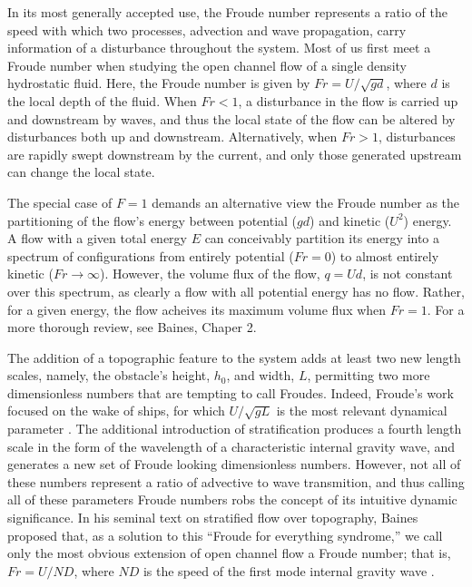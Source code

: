 \documentclass[12pt]{article}
\begin{document}
	In its most generally accepted use, the Froude number represents a ratio of the speed with which two processes,  advection and wave propagation, carry information of a disturbance throughout the system. Most of us first meet a Froude number when studying the open channel flow of a single density hydrostatic fluid. Here, the Froude number is given by $Fr=U/\sqrt{gd}$, where $d$ is the local depth of the fluid. When $Fr<1$, a disturbance in the flow is carried up and downstream by waves, and thus the local state of the flow can be altered by disturbances both up and downstream. Alternatively, when $Fr>1$, disturbances are rapidly swept downstream by the current, and only those generated upstream can change the local state. 
	
	The special case of $F=1$ demands an alternative view the Froude number as the partitioning of the flow's energy between potential ($gd$) and kinetic  ($U^2$) energy. A flow with a given total energy $E$ can conceivably partition its energy into a spectrum of configurations from entirely potential ($Fr=0$) to almost entirely kinetic ($Fr \to \infty$). However, the volume flux of the flow, $q=Ud$, is not constant over this spectrum, as clearly a flow with all potential energy has no flow. Rather, for a given energy, the flow acheives its maximum volume flux when $Fr=1$.  For a more thorough review, see Baines, Chaper 2. 
	
	
	The addition of a topographic feature to the system adds at least two new length scales, namely, the obstacle's height, $h_0$, and width, $L$, permitting two more dimensionless numbers that are tempting to call Froudes. Indeed, Froude's work focused on the wake of ships, for which $U/\sqrt{gL}$ is the most relevant dynamical parameter \citep{Baines1995}.  The additional introduction of stratification produces a fourth length scale in the form of the wavelength of a characteristic internal gravity wave, and generates a new set of Froude looking dimensionless numbers. However, not all of these numbers represent a ratio of advective to wave transmition, and thus calling all of these parameters Froude numbers robs the concept of its intuitive dynamic significance. In his seminal text on stratified flow over topography, Baines proposed that, as a solution to this ``Froude for everything syndrome,'' we call only the most obvious extension of open channel flow a Froude number; that is,  $Fr=U/ND$, where $ND$ is the speed of the first mode internal gravity wave \citep{Baines1995}. 
\end{document}
